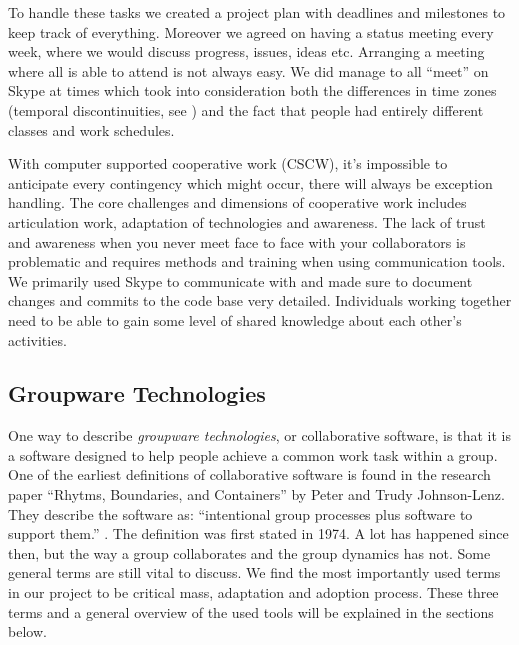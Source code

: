 To handle these tasks we created a project plan with deadlines and milestones to keep track of everything. Moreover we agreed on having a status meeting every week, where we would discuss progress, issues, ideas etc. Arranging a meeting where all is able to attend is not always easy. We did manage to all ``meet'' on Skype at times which took into consideration both the differences in time zones (temporal discontinuities, see ) and the fact that people had entirely different classes and work schedules.

With computer supported cooperative work (CSCW), it's impossible to anticipate every contingency which might occur, there will always be exception handling. The core challenges and dimensions of cooperative work includes articulation work, adaptation of technologies and awareness. The lack of trust and awareness when you never meet face to face with your collaborators is problematic and requires methods and training when using communication tools. We primarily used Skype to communicate with and made sure to document changes and commits to the code base very detailed. Individuals working together need to be able to gain some level of shared knowledge about each other's activities.


\subsection{Groupware Technologies} \label{subsec:groupwaretechnologies}
One way to describe \textit{groupware technologies}, or collaborative software, is that it is a software designed to help people achieve a common work task within a group. One of the earliest definitions of collaborative software is found in the research paper ``Rhytms, Boundaries, and Containers'' by Peter and Trudy Johnson-Lenz. They describe the software as: ``intentional group processes plus software to support them.'' \cite{johnson1991post}. The definition was first stated in 1974. A lot has happened since then, but the way a group collaborates and the group dynamics has not. Some general terms are still vital to discuss. We find the most importantly used terms in our project to be critical mass, adaptation and adoption process. These three terms and a general overview of the used tools will be explained in the sections below.

